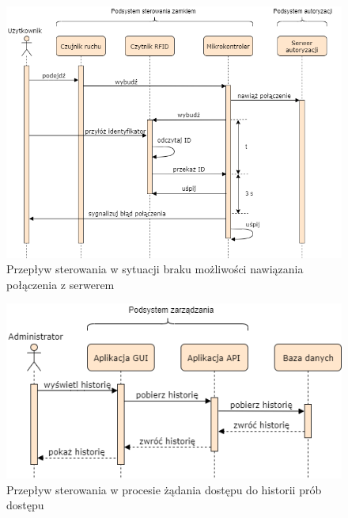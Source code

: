             \begin{figure}[]
                \includegraphics[width=\linewidth]{chapters/images/sequence3.png}
                \caption{Przepływ sterowania w sytuacji braku możliwości nawiązania połączenia z serwerem}
                \label{fig:sequence3}
            \end{figure}

            \begin{figure}[]
                \centering
                \includegraphics[width=.7\linewidth]{chapters/images/sequence4.png}
                \caption{Przepływ sterowania w procesie żądania dostępu do historii prób dostępu}
                \label{fig:sequence4}
            \end{figure}

